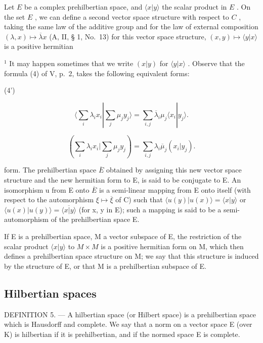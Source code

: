 Let \(E\) be a complex prehilbertian space, and \(\langle x|y\rangle\) the scalar product in \(E\) . On the set \(E\) , we can define a second vector space structure with respect to \(C\) , taking the same law of the additive group and for the law of external composition \((\lambda, x) \mapsto \overline{\lambda}x\) (A, II, § 1, No.~13) for this vector space structure, \((x, y) \mapsto \langle y|x\rangle\) is a positive hermitian

\(^{1}\) It may happen sometimes that we write \((x|y)\) for \(\langle y|x\rangle\) . Observe that the formula (4) of V, p.~2, takes the following equivalent forms:

(4')

\[
\langle \sum_ {i} \lambda_ {i} x _ {i} | \sum_ {j} \mu_ {j} y _ {j} \rangle = \sum_ {i, j} \overline {{{{\lambda}}}} _ {i} \mu_ {j} \langle x _ {i} | y _ {j} \rangle .\tag{4"}
\]

\[
(\sum_ {i} \lambda_ {i} x _ {i} | \sum_ {j} \mu_ {j} y _ {j}) = \sum_ {i, j} \lambda_ {i} \overline {{\mu}} _ {j} (x _ {i} | y _ {j}).
\]

form. The prehilbertian space \(\overline{E}\) obtained by assigning this new vector space structure and the new hermitian form to E, is said to be conjugate to E. An isomorphism u from E onto \(\overline{E}\) is a semi-linear mapping from E onto itself (with respect to the automorphism \(\xi \mapsto \overline{\xi}\) of C) such that \(\langle u(y)|u(x)\rangle = \langle x|y\rangle\) or \(\langle u(x)|u(y)\rangle = \overline{\langle x|y\rangle}\) (for x, y in E); such a mapping is said to be a semi-automorphism of the prehilbertian space E.

If E is a prehilbertian space, M a vector subspace of E, the restriction of the scalar product \(\langle x|y\rangle\) to \(M \times M\) is a positive hermitian form on M, which then defines a prehilbertian space structure on M; we say that this structure is induced by the structure of E, or that M is a prehilbertian subspace of E.

\subsection{Hilbertian spaces}

DEFINITION 5. --- A hilbertian space (or Hilbert space) is a prehilbertian space which is Hausdorff and complete. We say that a norm on a vector space E (over K) is hilbertian if it is prehilbertian, and if the normed space E is complete.

